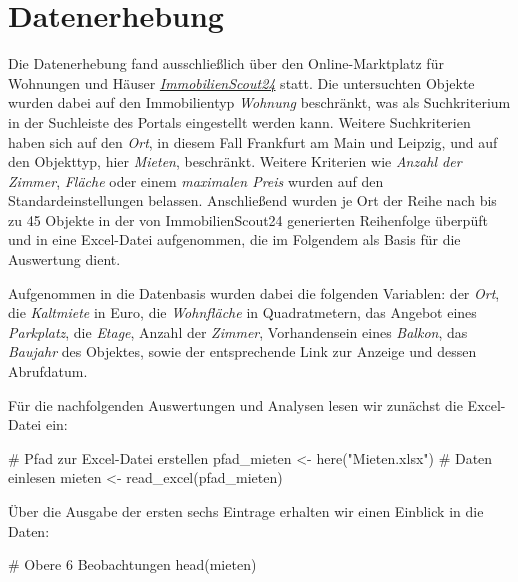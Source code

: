 \documentclass[
  a4paper,
  DIV=11]{scrartcl}
\newenvironment{Shaded}{\begin{snugshade}}{\end{snugshade}}
\newcommand{\CommentTok}[1]{\textcolor[rgb]{0.37,0.37,0.37}{#1}}
\newcommand{\FunctionTok}[1]{\textcolor[rgb]{0.28,0.35,0.67}{#1}}
\newcommand{\NormalTok}[1]{\textcolor[rgb]{0.00,0.23,0.31}{#1}}
\newcommand{\OtherTok}[1]{\textcolor[rgb]{0.00,0.23,0.31}{#1}}
\newcommand{\StringTok}[1]{\textcolor[rgb]{0.13,0.47,0.30}{#1}}
\begin{document}
\hypertarget{datenerhebung}{%
\section{Datenerhebung}\label{datenerhebung}}

Die Datenerhebung fand ausschließlich über den Online-Marktplatz für
Wohnungen und Häuser
\emph{\href{https://www.immobilienscout24.de/}{ImmobilienScout24}}
statt. Die untersuchten Objekte wurden dabei auf den Immobilientyp
\emph{Wohnung} beschränkt, was als Suchkriterium in der Suchleiste des
Portals eingestellt werden kann. Weitere Suchkriterien haben sich auf
den \emph{Ort}, in diesem Fall Frankfurt am Main und Leipzig, und auf
den Objekttyp, hier \emph{Mieten}, beschränkt. Weitere Kriterien wie
\emph{Anzahl der Zimmer}, \emph{Fläche} oder einem \emph{maximalen
Preis} wurden auf den Standardeinstellungen belassen. Anschließend
wurden je Ort der Reihe nach bis zu 45 Objekte in der von
ImmobilienScout24 generierten Reihenfolge überpüft und in eine
Excel-Datei aufgenommen, die im Folgendem als Basis für die Auswertung
dient.

Aufgenommen in die Datenbasis wurden dabei die folgenden Variablen: der
\emph{Ort}, die \emph{Kaltmiete} in Euro, die \emph{Wohnfläche} in
Quadratmetern, das Angebot eines \emph{Parkplatz}, die \emph{Etage},
Anzahl der \emph{Zimmer}, Vorhandensein eines \emph{Balkon}, das
\emph{Baujahr} des Objektes, sowie der entsprechende Link zur Anzeige
und dessen Abrufdatum.

Für die nachfolgenden Auswertungen und Analysen lesen wir zunächst die
Excel-Datei ein:

\begin{Shaded}
\begin{Highlighting}[]
\CommentTok{\# Pfad zur Excel{-}Datei erstellen}
\NormalTok{pfad\_mieten }\OtherTok{\textless{}{-}} \FunctionTok{here}\NormalTok{(}\StringTok{"Mieten.xlsx"}\NormalTok{)}
\CommentTok{\# Daten einlesen}
\NormalTok{mieten }\OtherTok{\textless{}{-}} \FunctionTok{read\_excel}\NormalTok{(pfad\_mieten)}
\end{Highlighting}
\end{Shaded}

Über die Ausgabe der ersten sechs Eintrage erhalten wir einen Einblick
in die Daten:

\begin{Shaded}
\begin{Highlighting}[]
\CommentTok{\# Obere 6 Beobachtungen}
\FunctionTok{head}\NormalTok{(mieten)}
\end{Highlighting}
\end{Shaded}
\end{document}
